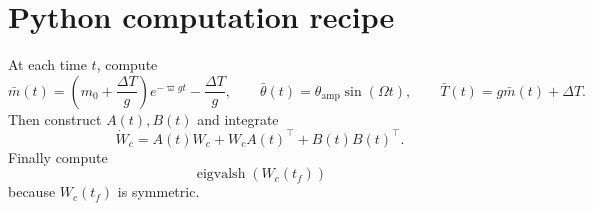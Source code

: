 \documentclass[10pt]{article}
\newcommand{\thb}{\bar\theta}
\newcommand{\mb}{\bar m}
\newcommand{\Tb}{\bar T}
\newcommand{\vphi}{\varpi}
\begin{document}
\section{Python computation recipe}
At each time $t$, compute
\[
    \mb(t)=\left(m_0+\frac{\Delta T}{g}\right)e^{-\vphi gt}-\frac{\Delta T}{g},
    \qquad
    \thb(t)=\theta_{\mathrm{amp}}\sin(\Omega t),
    \qquad
    \Tb(t)=g\mb(t)+\Delta T.
\]
Then construct $A(t),B(t)$ and integrate
\[
    \dot W_c=A(t)W_c+W_cA(t)^{\top}+B(t)B(t)^{\top}.
\]
Finally compute
\[
    \operatorname{eigvalsh}(W_c(t_f))
\]
because $W_c(t_f)$ is symmetric.
\end{document}
